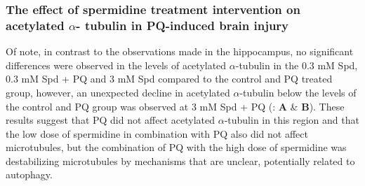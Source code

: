 \subsubsection{The effect of spermidine treatment intervention on acetylated $\alpha$- tubulin in PQ-induced brain injury}
Of note, in contrast to the observations made in the hippocampus, no significant differences were observed in the levels of acetylated $\alpha$-tubulin in the 0.3 mM Spd, 0.3 mM Spd + PQ and 3 mM Spd compared to the control and PQ treated group, however, an unexpected decline in acetylated $\alpha$-tubulin below the levels of the control and PQ group was observed at 3 mM Spd + PQ (: \textbf{A} \& \textbf{B}). These results suggest that PQ did not affect acetylated $\alpha$-tubulin in this region and that the low dose of spermidine in combination with PQ also did not affect microtubules, but the combination of PQ with the high dose of spermidine was destabilizing microtubules by mechanisms that are unclear, potentially related to autophagy. 

